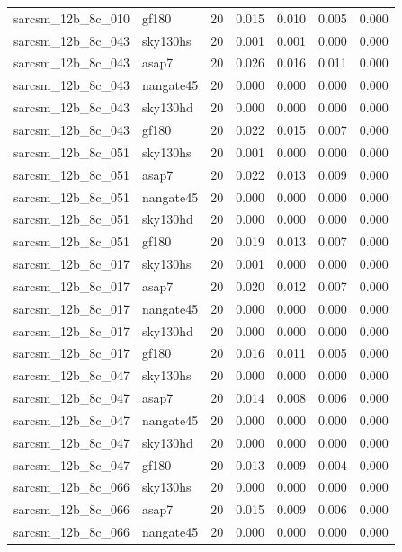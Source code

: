 \begin{tabular}{llrrrrr}
sarcsm\_12b\_8c\_010 & gf180 & 20 & 0.015 & 0.010 & 0.005 & 0.000 \\
sarcsm\_12b\_8c\_043 & sky130hs & 20 & 0.001 & 0.001 & 0.000 & 0.000 \\
sarcsm\_12b\_8c\_043 & asap7 & 20 & 0.026 & 0.016 & 0.011 & 0.000 \\
sarcsm\_12b\_8c\_043 & nangate45 & 20 & 0.000 & 0.000 & 0.000 & 0.000 \\
sarcsm\_12b\_8c\_043 & sky130hd & 20 & 0.000 & 0.000 & 0.000 & 0.000 \\
sarcsm\_12b\_8c\_043 & gf180 & 20 & 0.022 & 0.015 & 0.007 & 0.000 \\
sarcsm\_12b\_8c\_051 & sky130hs & 20 & 0.001 & 0.000 & 0.000 & 0.000 \\
sarcsm\_12b\_8c\_051 & asap7 & 20 & 0.022 & 0.013 & 0.009 & 0.000 \\
sarcsm\_12b\_8c\_051 & nangate45 & 20 & 0.000 & 0.000 & 0.000 & 0.000 \\
sarcsm\_12b\_8c\_051 & sky130hd & 20 & 0.000 & 0.000 & 0.000 & 0.000 \\
sarcsm\_12b\_8c\_051 & gf180 & 20 & 0.019 & 0.013 & 0.007 & 0.000 \\
sarcsm\_12b\_8c\_017 & sky130hs & 20 & 0.001 & 0.000 & 0.000 & 0.000 \\
sarcsm\_12b\_8c\_017 & asap7 & 20 & 0.020 & 0.012 & 0.007 & 0.000 \\
sarcsm\_12b\_8c\_017 & nangate45 & 20 & 0.000 & 0.000 & 0.000 & 0.000 \\
sarcsm\_12b\_8c\_017 & sky130hd & 20 & 0.000 & 0.000 & 0.000 & 0.000 \\
sarcsm\_12b\_8c\_017 & gf180 & 20 & 0.016 & 0.011 & 0.005 & 0.000 \\
sarcsm\_12b\_8c\_047 & sky130hs & 20 & 0.000 & 0.000 & 0.000 & 0.000 \\
sarcsm\_12b\_8c\_047 & asap7 & 20 & 0.014 & 0.008 & 0.006 & 0.000 \\
sarcsm\_12b\_8c\_047 & nangate45 & 20 & 0.000 & 0.000 & 0.000 & 0.000 \\
sarcsm\_12b\_8c\_047 & sky130hd & 20 & 0.000 & 0.000 & 0.000 & 0.000 \\
sarcsm\_12b\_8c\_047 & gf180 & 20 & 0.013 & 0.009 & 0.004 & 0.000 \\
sarcsm\_12b\_8c\_066 & sky130hs & 20 & 0.000 & 0.000 & 0.000 & 0.000 \\
sarcsm\_12b\_8c\_066 & asap7 & 20 & 0.015 & 0.009 & 0.006 & 0.000 \\
sarcsm\_12b\_8c\_066 & nangate45 & 20 & 0.000 & 0.000 & 0.000 & 0.000 \\

\end{tabular}
